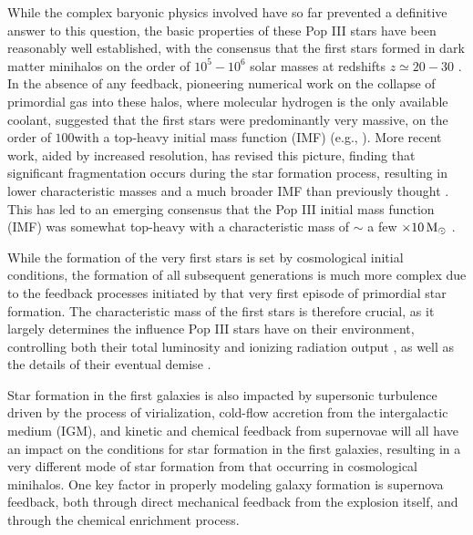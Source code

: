\documentclass[../thesis.tex]{subfiles}
\begin{document}
While the complex baryonic physics involved have so far prevented a definitive answer to this question, the basic properties of these Pop III stars have been reasonably well established, with the consensus that the first stars formed in dark matter minihalos on the order of $10^5-10^6$ solar masses at redshifts $z \simeq 20-30$ \citep{CouchmanRees1986,   HaimanThoulLoeb1996, Tegmarketal1997}.  
In the absence of any feedback, pioneering numerical work on the collapse of primordial gas into these halos, where molecular hydrogen is the only available coolant, suggested that the first stars were predominantly very massive, on the order of $100$\msun with a top-heavy initial mass function (IMF) (e.g., \citealt{BrommCoppiLarson1999, BrommCoppiLarson2002, AbelBryanNorman2002, BrommLarson2004, Yoshidaetal2006, O'SheaNorman2007}).  
More recent work, aided by increased resolution, has revised this picture, finding that significant fragmentation occurs during the star formation process, resulting in lower characteristic masses and a much broader IMF than previously thought \citep{StacyGreifBromm2010,Clarketal2011a,Clarketal2011b,Greifetal2011,Greifetal2012,StacyBromm2013,Hiranoetal2014,Hosokawaetal2015}. This has led to an emerging consensus that the Pop III initial mass function (IMF) was somewhat top-heavy with a characteristic mass of $\sim$ a few $\times 10\,\mathrm{M}_{\odot}$ \citep{Bromm2013}. 

While the formation of the very first stars is set by cosmological initial conditions, the formation of all subsequent generations is much more complex due to the feedback processes initiated by that very first episode of primordial star formation.
The characteristic mass of the first stars is therefore crucial, as it largely determines the influence Pop III stars have on their environment, controlling both their total luminosity and ionizing radiation output \citep{Schaerer2002}, as well as the details of their eventual demise \citep{Hegeretal2003,HegerWoosley2010,MaederMeynet2012}.

Star formation in the first galaxies is also impacted by supersonic turbulence driven by the process of virialization, cold-flow accretion from the intergalactic medium (IGM), and kinetic and chemical feedback from supernovae will all have an impact on the conditions for star formation in the first galaxies, resulting in a very different mode of star formation from that occurring in cosmological minihalos. 
One key factor in properly modeling galaxy formation is supernova
feedback, both through direct mechanical feedback from the explosion
itself, and through the chemical enrichment process.
\end{document}
